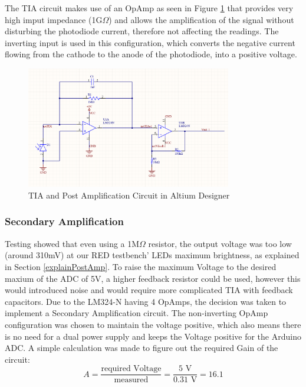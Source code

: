 The \ac{TIA} circuit makes use of an \ac{OpAmp} as seen in Figure \ref{fig:AltiumDis} that provides very high imput impedance (1G$\Omega$) and allows the amplification of the signal without disturbing the photodiode current, therefore not affecting the readings. The inverting input is used in this configuration, which converts the negative current flowing from the cathode to the anode of the photodiode, into a positive voltage.

%
\begin{figure}[htbp] %
    \centering
    \includegraphics[width=0.8\textwidth]{chapters/methodology/prototype/AltiumSingleCircuit_wCap.png}
    \caption{TIA and Post Amplification Circuit in Altium Designer}
    \label{fig:AltiumDis}
  \end{figure}
%
%
\subsubsection{Secondary Amplification}
\label{secondAmp}  
Testing showed that even using a 1M$\Omega$ resistor, the output voltage was too low (around 310mV) at our \ac{RED} testbench' \acp{LED} maximum brightness, as explained in Section \ref{explainPostAmp}. To raise the maximum Voltage to the desired maxium of the ADC of 5V, a higher feedback resistor could be used, however this would introduced noise and would require more complicated TIA with feedback capacitors. Due to the LM324-N having 4 \acp{OpAmp}, the decision was taken to implement a Secondary Amplification circuit. The non-inverting \ac{OpAmp} configuration was chosen to maintain the voltage positive, which also means there is no need for a dual power supply and keeps the Voltage positive for the Arduino ADC.
A simple calculation was made to figure out the required Gain of the circuit:
\begin{equation} \label{gainCalc}
  A = \frac{\text{required Voltage}}{\text{measured}} = \frac{5\text{ V}}{0.31\text{ V}} = 16.1
  \end{equation}

